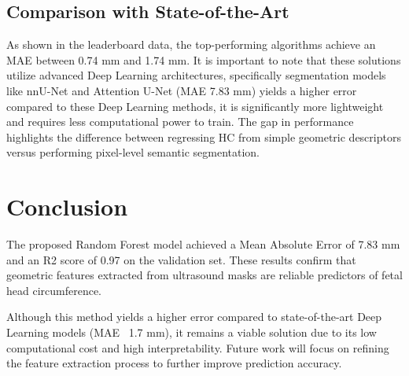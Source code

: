 \documentclass{IEEEtran}
\begin{document}
\subsection{Comparison with State-of-the-Art}
As shown in the leaderboard data, the top-performing algorithms achieve an MAE between 0.74 mm and 1.74 mm. It is important to note that these solutions utilize advanced Deep Learning architectures, specifically segmentation models like nnU-Net and Attention U-Net (MAE 7.83 mm) yields a higher error compared to these Deep Learning methods, it is significantly more lightweight and requires less computational power to train. The gap in performance highlights the difference between regressing HC from simple geometric descriptors versus performing pixel-level semantic segmentation.
\section{Conclusion}
The proposed Random Forest model achieved a Mean Absolute Error of 7.83 mm and an R2 score of 0.97 on the validation set. These results confirm that geometric features extracted from ultrasound masks are reliable predictors of fetal head circumference.

Although this method yields a higher error compared to state-of-the-art Deep Learning models (MAE ~1.7 mm), it remains a viable solution due to its low computational cost and high interpretability. Future work will focus on refining the feature extraction process to further improve prediction accuracy.
\end{document}
